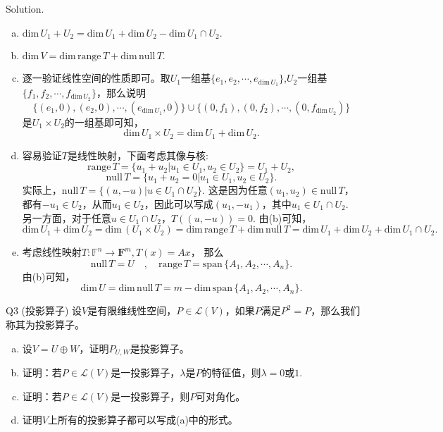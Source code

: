 \documentclass[12pt]{article}
\begin{document}
\noindent{} Solution. 
\begin{enumerate}[(a)]
\item $\mathrm{dim}\, U_1+U_2 = \mathrm{dim}\, U_1+\mathrm{dim}\, U_2 - \mathrm{dim}\, U_1\cap U_2. $
\item $\mathrm{dim}\,V = \mathrm{dim}\, \mathrm{range}\,T+\mathrm{dim}\,\mathrm{null}\, T.$
\item 逐一验证线性空间的性质即可。取$U_1$一组基$\{e_1,e_2,\cdots, e_{\mathrm{dim}\,U_1}\}$,$U_2$一组基$\{f_1,f_2,\cdots,f_{\mathrm{dim}\,U_2}\}$，那么说明
$$\{(e_1,0),(e_2,0),\cdots, (e_{\mathrm{dim}\,U_1},0)\}\cup\{(0,f_1),(0,f_2),\cdots,(0,f_{\mathrm{dim}\,U_2})\}$$
是$U_1\times U_2$的一组基即可知，
\[\mathrm{dim}\,U_1\times U_2 = \mathrm{dim}\, U_1+\mathrm{dim}\,U_2. \]
\item 容易验证$T$是线性映射，下面考虑其像与核:
\[\mathrm{range}\,T = \{u_1+u_2|u_1\in U_1,u_2\in U_2\} = U_1+U_2,\]
\[\mathrm{null}\,T =\{u_1+u_2 =0|u_1\in U_1,u_2\in U_2\}.\]
实际上，$\mathrm{null}\,T =\{(u,-u)|u\in U_1\cap U_2\}$. 这是因为任意$(u_1,u_2)\in \mathrm{null}\,T$， 都有$-u_1\in U_2$，从而$u_1\in U_2$，因此可以写成$(u_1,-u_1)$，其中$u_1\in U_1\cap U_2$. 另一方面，对于任意$u\in U_1\cap U_2$，$T((u,-u))=0$. 由(b)可知，
\[\mathrm{dim}\,U_1 +\mathrm{dim}\,U_2
=\mathrm{dim}\,(U_1\times U_2) 
= \mathrm{dim}\,\mathrm{range}\,T+ \mathrm{dim}\,\mathrm{null}\,T 
= \mathrm{dim}\,U_1+\mathrm{dim}\,U_2 +\mathrm{dim}\,U_1\cap U_2.
\]
\item 考虑线性映射$T:\mathbb{F}^n\rightarrow \mathbf{F}^m, T(x) = Ax$， 那么
\[\mathrm{null}\, T=U\quad ,\quad \mathrm{range}\,T = \mathrm{span}\,\{A_1,A_2,\cdots,A_n\}.\]
由(b)可知，
\[\mathrm{dim}\,U=\mathrm{dim}\,\mathrm{null}\,T = m-\mathrm{dim}\,\mathrm{span}\,\{A_1,A_2,\cdots,A_n\}.\]
\end{enumerate}

\bigskip

\noindent{} Q3 (投影算子) 设$V$是有限维线性空间，$P\in\mathcal{L}(V)$，如果$P$满足$P^2 = P$，那么我们称其为投影算子。
\begin{enumerate}[(a)]
\item 设$V=U\oplus W$，证明$P_{U,W}$是投影算子。
\item 证明：若$P\in\mathcal{L}(V)$是一投影算子，$\lambda$是$P$的特征值，则$\lambda=0$或$1$.
\item 证明：若$P\in\mathcal{L}(V)$是一投影算子，则$P$可对角化。
\item 证明$V$上所有的投影算子都可以写成(a)中的形式。
\end{enumerate}
\end{document}
